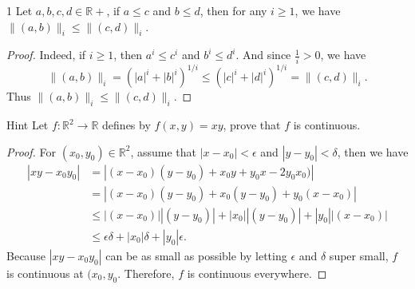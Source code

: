 \documentclass[12pt, a4paper]{article}
\theoremstyle{plain}
\newcommand{\R}{\mathbb{R}}
\begin{document}
\pagebreak

\begin{lemma}1
Let $a,b,c,d\in \R+$, if $a\leq c$ and $b\leq d$, then for any $i\geq 1$, we have $\|(a,b)\|_i\leq \|(c,d)\|_i$.
\end{lemma}
	\begin{proof}
	Indeed, if $i\geq 1$, then $a^i\leq c^i$ and $b^i\leq d^i$. And since $\frac{1}{i}>0$, we have 
	\[
	\|(a,b)\|_i = (|a|^i+|b|^i)^{1/i}\leq (|c|^i+|d|^i)^{1/i}=\|(c,d)\|_i.
	\]
	Thus $\|(a,b)\|_i\leq \|(c,d)\|_i$.
	\end{proof}
	
\begin{exercise}{Hint}
Let $f:\R^2\rightarrow\R$ defines by $f(x,y)=xy$, prove that $f$ is continuous.
\end{exercise}
	\begin{proof}
	For $(x_0,y_0)\in \R^2$, assume that $|x-x_0|<\epsilon$ and $|y-y_0|<\delta$, then we have
	\begin{align*}
	|xy-x_0y_0|&=|(x-x_0)(y-y_0)+x_0y+y_0x-2y_0x_0)|\\
	&=|(x-x_0)(y-y_0)+x_0(y-y_0)+y_0(x-x_0)|\\
	&\leq |(x-x_0)||(y-y_0)|+|x_0||(y-y_0)|+|y_0||(x-x_0)|\\
	&\leq \epsilon\delta+|x_0|\delta +|y_0|\epsilon.	
	\end{align*}
	Because $|xy-x_0y_0|$ can be as small as possible by letting $\epsilon$ and $\delta$ super small, $f$ is continuous at $(x_0,y_0$. Therefore, $f$ is continuous everywhere.
	\end{proof}
\end{document}
